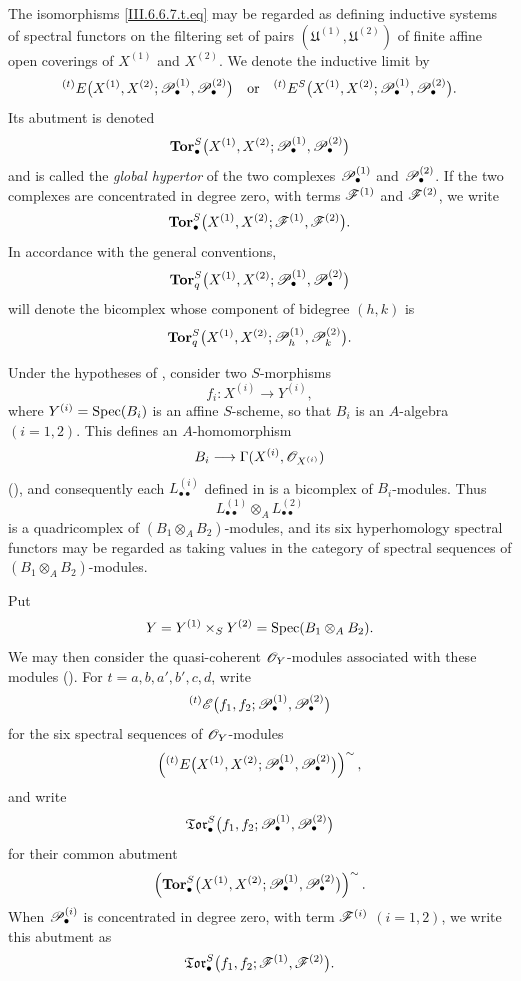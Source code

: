 \begin{env}[6.6.7]

The isomorphisms \eqref{III.6.6.7.t.eq} may be regarded as
defining inductive systems of spectral functors on the filtering
set of pairs
$(\mathfrak U^{(1)},\mathfrak U^{(2)})$ of finite affine open
coverings of $X^{(1)}$ and $X^{(2)}$.  We denote the inductive
limit by
\[
  {}^{(t)}E
  \bigl(
    X^{(1)},X^{(2)};
    \mathscr{P}_\bullet^{(1)},\mathscr{P}_\bullet^{(2)}
  \bigr)
  \quad\text{or}\quad
  {}^{(t)}E^S
  \bigl(
    X^{(1)},X^{(2)};
    \mathscr{P}_\bullet^{(1)},\mathscr{P}_\bullet^{(2)}
  \bigr).
\]
Its abutment is denoted
\[
  \mathbf{Tor}_\bullet^S
  \bigl(
    X^{(1)},X^{(2)};
    \mathscr{P}_\bullet^{(1)},\mathscr{P}_\bullet^{(2)}
  \bigr)
\]
and is called the \emph{global hypertor} of the two complexes
$\mathscr{P}_\bullet^{(1)}$ and $\mathscr{P}_\bullet^{(2)}$.  If the two
complexes are concentrated in degree zero, with terms
$\mathscr{F}^{(1)}$ and $\mathscr{F}^{(2)}$, we write
\[
  \mathbf{Tor}_\bullet^S
  \bigl(
    X^{(1)},X^{(2)};
    \mathscr{F}^{(1)},\mathscr{F}^{(2)}
  \bigr).
\]
In accordance with the general conventions,
\[
  \mathbf{Tor}_q^S
  \bigl(
    X^{(1)},X^{(2)};
    \mathscr{P}_\bullet^{(1)},\mathscr{P}_\bullet^{(2)}
  \bigr)
\]
will denote the bicomplex whose component of bidegree $(h,k)$ is
\[
  \mathbf{Tor}_q^S
  \bigl(
    X^{(1)},X^{(2)};
    \mathscr{P}_h^{(1)},\mathscr{P}_k^{(2)}
  \bigr).
\]
\end{env}

\begin{env}[6.6.8]
\label{III.6.6.8}
Under the hypotheses of , consider two
$S$-morphisms
\[
  f_i:X^{(i)}\longrightarrow Y^{(i)},
\]
where
$Y^{(i)}=\operatorname{Spec}(B_i)$ is an affine $S$-scheme, so that $B_i$ is
an $A$-algebra $(i=1,2)$.  This defines an $A$-homomorphism
\[
  B_i\longrightarrow
  \Gamma(X^{(i)},\mathscr{O}_{X^{(i)}})
\]
(), and consequently each
$L_{\bullet\bullet}^{(i)}$ defined in  is a
bicomplex of $B_i$-modules.  Thus
\[
  L_{\bullet\bullet}^{(1)}
  \otimes_A L_{\bullet\bullet}^{(2)}
\]
is a quadricomplex of $(B_1\otimes_AB_2)$-modules, and its six
hyperhomology spectral functors may be regarded as taking values
in the category of spectral sequences of
$(B_1\otimes_AB_2)$-modules.

Put
\[
  Y=Y^{(1)}\times_SY^{(2)}
   =\operatorname{Spec}(B_1\otimes_AB_2).
\]
We may then consider the quasi-coherent $\mathscr{O}_Y$-modules
associated with these modules ().  For
$t=a,b,a',b',c,d$, write
\[
  {}^{(t)}\mathscr{E}
  \bigl(
    f_1,f_2;
    \mathscr{P}_\bullet^{(1)},\mathscr{P}_\bullet^{(2)}
  \bigr)
\]
for the six spectral sequences of $\mathscr{O}_Y$-modules
\[
  \left(
    {}^{(t)}E
    \bigl(
      X^{(1)},X^{(2)};
      \mathscr{P}_\bullet^{(1)},\mathscr{P}_\bullet^{(2)}
    \bigr)
  \right)^{\sim},
\]
and write
\[
  \mathfrak{Tor}_\bullet^S
  \bigl(
    f_1,f_2;
    \mathscr{P}_\bullet^{(1)},\mathscr{P}_\bullet^{(2)}
  \bigr)
\]
for their common abutment
\[
  \left(
    \mathbf{Tor}_\bullet^S
    \bigl(
      X^{(1)},X^{(2)};
      \mathscr{P}_\bullet^{(1)},\mathscr{P}_\bullet^{(2)}
    \bigr)
  \right)^{\sim}.
\]
When $\mathscr{P}_\bullet^{(i)}$ is concentrated in degree zero, with
term $\mathscr{F}^{(i)}$ $(i=1,2)$, we write this abutment as
\[
  \mathfrak{Tor}_\bullet^S
  \bigl(
    f_1,f_2;
    \mathscr{F}^{(1)},\mathscr{F}^{(2)}
  \bigr).
\]
\end{env}


